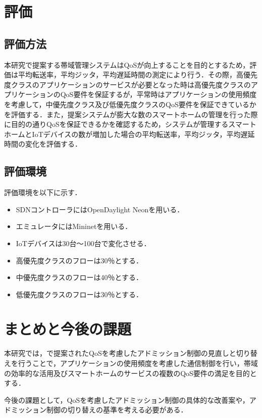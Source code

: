 \documentclass[a4paper,10pt,twocolumn,uplatex]{jsarticle}
\begin{document}
\section{評価}

\subsection{評価方法}
本研究で提案する帯域管理システムはQoSが向上することを目的とするため，評価は平均転送率，平均ジッタ，平均遅延時間の測定により行う．その際，高優先度クラスのアプリケーションのサービスが必要となった時は高優先度クラスのアプリケーションのQoS要件を保証するが，平常時はアプリケーションの使用頻度を考慮して，中優先度クラス及び低優先度クラスのQoS要件を保証できているかを評価する．また，提案システムが膨大な数のスマートホームの管理を行った際に目的の通りQoSを保証できるかを確認するため，システムが管理するスマートホームとIoTデバイスの数が増加した場合の平均転送率，平均ジッタ，平均遅延時間の変化を評価する．\par

\subsection{評価環境}
評価環境を以下に示す．\par

\begin{itemize}
  \item SDNコントローラにはOpenDaylight Neonを用いる．
  \item エミュレータにはMininetを用いる．
  \item IoTデバイスは30台〜100台で変化させる．
  \item 高優先度クラスのフローは30％とする．
  \item 中優先度クラスのフローは40％とする．
  \item 低優先度クラスのフローは30％とする．
\end{itemize}

\section{まとめと今後の課題}
本研究では，\cite{AQRA}で提案されたQoSを考慮したアドミッション制御の見直しと切り替えを行うことで，アプリケーションの使用頻度を考慮した通信制御を行い，帯域の効率的な活用及びスマートホームのサービスの複数のQoS要件の満足を目的とする．\par
今後の課題として，QoSを考慮したアドミッション制御の具体的な改善案や，アドミッション制御の切り替えの基準を考える必要がある．\par
\end{document}
